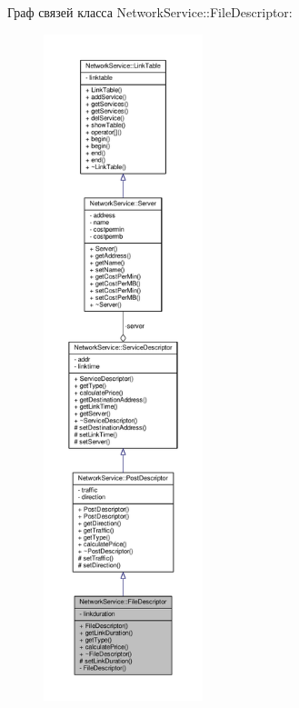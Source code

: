 Граф связей класса Network\+Service\+:\+:File\+Descriptor\+:\nopagebreak
\begin{figure}[H]
\begin{center}
\leavevmode
\includegraphics[height=550pt]{class_network_service_1_1_file_descriptor__coll__graph}
\end{center}
\end{figure}
